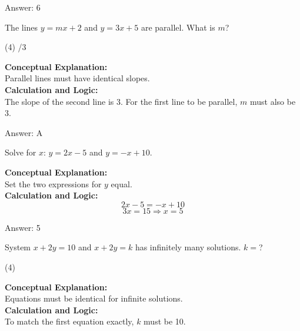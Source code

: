 \documentclass[11pt,paper=a4,answers]{exam}
\begin{document}
\begin{questions}
\begin{solution}
\vspace{15pt}
Answer: \colorbox{yellow!100}{6}
\end{solution}

\question
The lines $y = mx + 2$ and $y = 3x + 5$ are parallel. What is $m$?
\begin{tasks}(4)
    /3
\end{tasks}

\begin{solution}
\textbf{Conceptual Explanation:} \\
Parallel lines must have identical slopes.
\\[10pt]
\textbf{Calculation and Logic:} \\
The slope of the second line is 3. For the first line to be parallel, $m$ must also be 3.

\vspace{15pt}
Answer: \colorbox{yellow!100}{A}
\end{solution}

\question
Solve for $x$: $y = 2x - 5$ and $y = -x + 10$.

\begin{solution}
\textbf{Conceptual Explanation:} \\
Set the two expressions for $y$ equal.
\\[10pt]
\textbf{Calculation and Logic:} \\
\[2x - 5 = -x + 10\]
\[3x = 15 \Rightarrow x = 5\]

\vspace{15pt}
Answer: \colorbox{yellow!100}{5}
\end{solution}

\question
System $x + 2y = 10$ and $x + 2y = k$ has infinitely many solutions. $k = $?
\begin{tasks}(4)
\end{tasks}

\begin{solution}
\textbf{Conceptual Explanation:} \\
Equations must be identical for infinite solutions.
\\[10pt]
\textbf{Calculation and Logic:} \\
To match the first equation exactly, $k$ must be 10.


\end{solution}
\end{questions}
\end{document}
